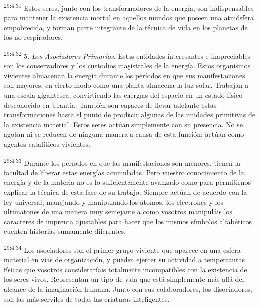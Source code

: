 \par
\textsuperscript{29:4.31} Estos seres, junto con los transformadores de la energía, son indispensables para mantener la existencia mortal en aquellos mundos que poseen una atmósfera empobrecida, y forman parte integrante de la técnica de vida en los planetas de los no respiradores.

\par
\textsuperscript{29:4.32} 5. \textit{Los Asociadores Primarios.} Estas entidades interesantes e inapreciables son los conservadores y los custodios magistrales de la energía. Estos organismos vivientes almacenan la energía durante los períodos en que sus manifestaciones son mayores, en cierto modo como una planta almacena la luz solar. Trabajan a una escala gigantesca, convirtiendo las energías del espacio en un estado físico desconocido en Urantia. También son capaces de llevar adelante estas transformaciones hasta el punto de producir algunas de las unidades primitivas de la existencia material. Estos seres actúan simplemente con su presencia. No se agotan ni se reducen de ninguna manera a causa de esta función; actúan como agentes catalíticos vivientes.

\par
\textsuperscript{29:4.33} Durante los períodos en que las manifestaciones son menores, tienen la facultad de liberar estas energías acumuladas. Pero vuestro conocimiento de la energía y de la materia no es lo suficientemente avanzado como para permitirnos explicar la técnica de esta fase de su trabajo. Siempre actúan de acuerdo con la ley universal, manejando y manipulando los átomos, los electrones y los ultimatones de una manera muy semejante a como vosotros manipuláis los caracteres de imprenta ajustables para hacer que los mismos símbolos alfabéticos cuenten historias sumamente diferentes.

\par
\textsuperscript{29:4.34} Los asociadores son el primer grupo viviente que aparece en una esfera material en vías de organización, y pueden ejercer su actividad a temperaturas físicas que vosotros consideraríais totalmente incompatibles con la existencia de los seres vivos. Representan un tipo de vida que está simplemente más allá del alcance de la imaginación humana. Junto con sus colaboradores, los disociadores, son las más serviles de todas las criaturas inteligentes.

